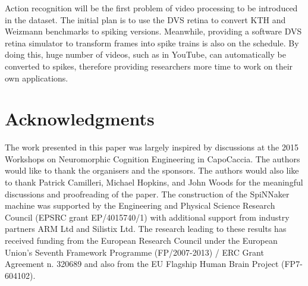 \documentclass{frontiersENG} %
\begin{document}
Action recognition will be the first problem of video processing to be introduced in the dataset.
The initial plan is to use the DVS retina to convert KTH and Weizmann benchmarks to spiking versions.
Meanwhile, providing a software DVS retina simulator to transform  frames into spike trains is also on the schedule.
By doing this, huge number of videos, such as in YouTube, can automatically be converted to spikes, therefore providing researchers more time to work on their own applications.



\section*{Acknowledgments}

The work presented in this paper was largely inspired by discussions at the 2015 Workshops on Neuromorphic Cognition Engineering in CapoCaccia.
The authors would like to thank the organisers and the sponsors.
The authors would also like to thank Patrick Camilleri, Michael Hopkins, and John Woods for the meaningful discussions and proofreading of the paper.
The construction of the SpiNNaker machine was supported by the Engineering and Physical Science Research Council (EPSRC grant EP/4015740/1) with additional support from industry partners ARM Ltd and Silistix Ltd.
The research leading to these results has received funding from the European Research Council under the European Union's Seventh Framework Programme (FP/2007-2013) / ERC Grant Agreement n. 320689 and also from the EU Flagship Human Brain Project (FP7-604102). 



%
\end{document}
